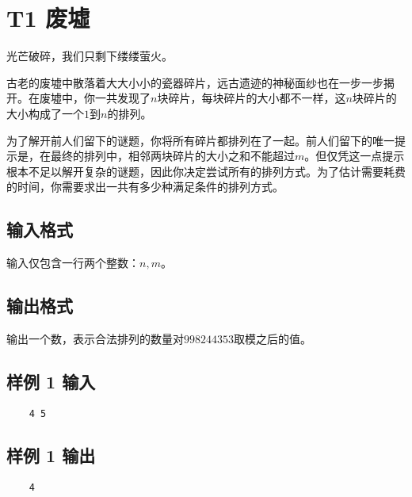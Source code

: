\documentclass[12pt]{article}
\date{}
\begin{document}
\pagestyle{main}

\section{T1 废墟}

光芒破碎，我们只剩下缕缕萤火。\par

古老的废墟中散落着大大小小的瓷器碎片，远古遗迹的神秘面纱也在一步一步揭开。在废墟中，你一共发现了$n$块碎片，每块碎片的大小都不一样，这$n$块碎片的大小构成了一个$1$到$n$的排列。\par
为了解开前人们留下的谜题，你将所有碎片都排列在了一起。前人们留下的唯一提示是，在最终的排列中，相邻两块碎片的大小之和不能超过$m$。但仅凭这一点提示根本不足以解开复杂的谜题，因此你决定尝试所有的排列方式。为了估计需要耗费的时间，你需要求出一共有多少种满足条件的排列方式。\par

\subsection{输入格式}

输入仅包含一行两个整数：$n, m$。

\subsection{输出格式}

输出一个数，表示合法排列的数量对$998244353$取模之后的值。

\subsection{样例 1 输入}

\begin{lstlisting}
    4 5
\end{lstlisting}

\subsection{样例 1 输出}

\begin{lstlisting}
    4
\end{lstlisting}
\end{document}
